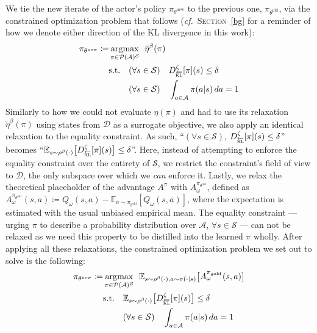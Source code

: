 We tie the new iterate of the actor's policy $\pi_{\theta^\text{new}}$ to the previous one, $\pi_{\theta^\text{old}}$,
via the constrained optimization problem that follows (\textit{cf.}~\textsc{Section}~\ref{bg} for a reminder of
how we denote either direction of the KL divergence in this work):
\begin{align}
  \pi_{\theta^\text{new}} \coloneqq
  &\argmax_{\pi \in \mathcal{P}(\mathcal{A})^\mathcal{S}} \;\,
  \tilde{\eta}^\beta (\pi)
  \label{piobjectiveorig1} \\
  &\text{s.t.} \quad
  (\forall s \in \mathcal{S}) \quad
  D^\zeta_{\overleftarrow{\textsc{kl}}}[\pi](s) \leq \delta
  \label{piobjectiveorig2} \\
  &\phantom{\text{s.t.}} \quad
  (\forall s \in \mathcal{S}) \quad
  \int_{a \in \mathcal{A}} \pi(a | s) \, da = 1
  \label{piobjectiveorig3}
\end{align}
Similarly to how we could not evaluate $\eta(\pi)$ and had to use its
relaxation $\tilde{\eta}^\beta (\pi)$ using states from $\mathcal{D}$
as a surrogate objective,
we also apply an identical relaxation to the equality constraint.
As such,
``$(\forall s \in \mathcal{S})$, $D^\zeta_{\overleftarrow{\textsc{kl}}}[\pi](s) \leq \delta$'' becomes
``$\mathbb{E}_{s \sim \rho^\beta(\cdot)}
\big[D^\zeta_{\overleftarrow{\textsc{kl}}}[\pi](s)\big] \leq \delta $''.
Here, instead of attempting to enforce the
equality constraint over the entirety of  $\mathcal{S}$,
we restrict the constraint's field of view to $\mathcal{D}$,
the only subspace over which we \emph{can} enforce it.
Lastly, we relax the theoretical placeholder of the advantage $A^\pi$ with
$A^{\pi_{\theta^\text{old}}}_\omega$, defined as
$A^{\pi_{\theta^\text{old}}}_\omega(s,a) \coloneqq Q_\omega(s,a) -
\mathbb{E}_{\bar{a} \sim \pi_{\theta^\text{old}}}[Q_\omega(s,\bar{a})]$,
where the expectation is estimated with the usual unbiased empirical mean.
The equality constraint --- urging $\pi$ to describe a probability distribution over $\mathcal{A}$,
$\forall s \in \mathcal{S}$ --- can not be relaxed
as we need this property to be distilled into the learned $\pi$ wholly.
After applying all these relaxations, the constrained optimization problem we set out to solve is
the following:
\begin{align}
  \pi_{\theta^\text{new}} \coloneqq
  &\argmax_{\pi \in \mathcal{P}(\mathcal{A})^\mathcal{S}} \;\,
  \mathbb{E}_{s \sim \rho^\beta(\cdot), a \sim \pi(\cdot | s)}
  \big[A^{\pi_{\theta^\text{old}}}_\omega(s,a)\big]
  \label{piobjective} \\
  &\text{s.t.} \quad
  \mathbb{E}_{s \sim \rho^\beta(\cdot)}\big[D^\zeta_{\overleftarrow{\textsc{kl}}}[\pi](s)\big] \leq \delta
  \label{piineq} \\
  &\phantom{\text{s.t.}} \quad
  (\forall s \in \mathcal{S}) \quad
  \int_{a \in \mathcal{A}} \pi(a | s) \, da = 1
  \label{pieq}
\end{align}
